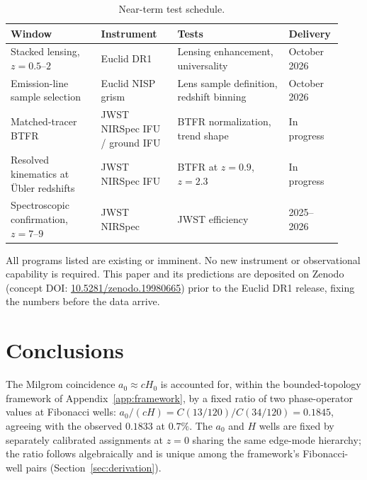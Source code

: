 \documentclass[11pt,a4paper]{article}
\numberwithin{equation}{section}
\numberwithin{table}{section}
\numberwithin{figure}{section}
\newcommand{\afid}{a_0}
\newcommand{\Cval}[1]{C(#1/120)}
\begin{document}
\begin{table}[!ht]
\centering
\caption{Near-term test schedule.}
\label{tab:schedule}
\footnotesize
\setlength{\tabcolsep}{3pt}
\begin{tabular}{p{0.26\linewidth} p{0.22\linewidth} p{0.32\linewidth} p{0.13\linewidth}}
\toprule
Window & Instrument & Tests & Delivery \\
\midrule
Stacked lensing, $z = 0.5$--$2$            & Euclid DR1                    & Lensing enhancement, universality        & October 2026 \\
Emission-line sample selection             & Euclid NISP grism             & Lens sample definition, redshift binning & October 2026 \\
Matched-tracer BTFR                        & JWST NIRSpec IFU / ground IFU & BTFR normalization, trend shape          & In progress  \\
Resolved kinematics at {\"U}bler redshifts & JWST NIRSpec IFU              & BTFR at $z = 0.9$, $z = 2.3$             & In progress  \\
Spectroscopic confirmation, $z = 7$--$9$   & JWST NIRSpec                  & JWST efficiency                          & 2025--2026   \\
\bottomrule
\end{tabular}
\end{table}

\newpage

All programs listed are existing or imminent. No new instrument or
observational capability is required. This paper and its predictions
are deposited on Zenodo (concept DOI:
\href{https://doi.org/10.5281/zenodo.19980665}{10.5281/zenodo.19980665})
prior to the Euclid DR1 release, fixing the numbers before the data
arrive.

\section{Conclusions}
\label{sec:conclusions}

The Milgrom coincidence $\afid \approx cH_0$ is accounted for, within
the bounded-topology framework of Appendix~\ref{app:framework}, by a
fixed ratio of two phase-operator values at Fibonacci wells:
$\afid/(cH) = \Cval{13}/\Cval{34} = 0.1845$, agreeing with the observed
$0.1833$ at $0.7\%$. The $\afid$ and $H$ wells are fixed by separately
calibrated assignments at $z = 0$ sharing the same edge-mode hierarchy;
the ratio follows algebraically and is unique among the framework's
Fibonacci-well pairs (Section~\ref{sec:derivation}).
\end{document}
